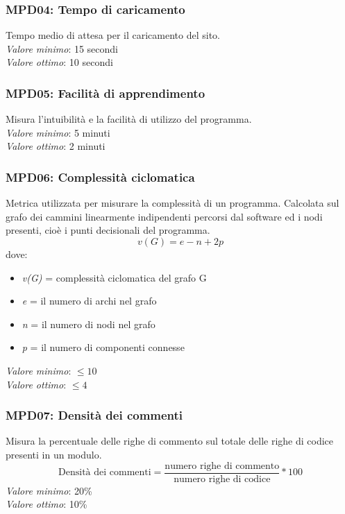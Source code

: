 \subsubsection{MPD04: Tempo di caricamento}
Tempo medio di attesa per il caricamento del sito.\\
\textit{Valore minimo}: 15 secondi\\
\textit{Valore ottimo}: 10 secondi\\

\subsubsection{MPD05: Facilità di apprendimento}
Misura l'intuibilità e la facilità di utilizzo del programma.\\
\textit{Valore minimo}: 5 minuti\\
\textit{Valore ottimo}: 2 minuti\\

\subsubsection{MPD06: Complessità ciclomatica}
Metrica utilizzata per misurare la complessità di un programma. Calcolata sul grafo dei cammini linearmente indipendenti percorsi dal software ed i nodi presenti, cioè i punti decisionali del programma.\\
\begin{equation*}
v(G) = e - n + 2p
\end{equation*}
dove:
\begin{itemize}
	\item \textit{v(G)} = complessità ciclomatica del grafo G
	\item \textit{e} = il numero di archi nel grafo
	\item \textit{n} = il numero di nodi nel grafo
	\item \textit{p} = il numero di componenti connesse
\end{itemize}
\textit{Valore minimo}: $ \le 10 $\\
\textit{Valore ottimo}: $ \le 4 $\\

\subsubsection{MPD07: Densità dei commenti}
Misura la percentuale delle righe di commento sul totale delle righe di codice presenti in un modulo.\\
\begin{equation*}
\text{Densità dei commenti}=\frac{\text{numero righe di commento}}{\text{numero righe di codice}}*100
\end{equation*}
\textit{Valore minimo}: 20\%\\
\textit{Valore ottimo}: 10\%\\

